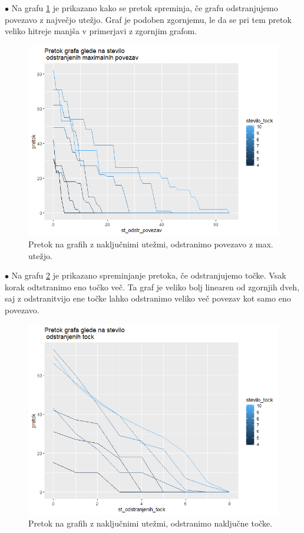 \documentclass[a4paper]{article}
\begin{document}
\pagebreak
$\bullet $ Na grafu \ref{fig4} je prikazano kako se pretok spreminja, če grafu odstranjujemo povezavo z največjo utežjo. Graf je podoben zgornjemu, le da se pri tem pretok veliko hitreje manjša v primerjavi z zgornjim grafom. 
\begin{figure}[H]
\centerline{\includegraphics[scale=.5]{p4.PNG}}
\caption{Pretok na grafih z naključnimi utežmi, odstranimo povezavo z max. utežjo. }
\label{fig4}
\end{figure}

$\bullet $ Na grafu \ref{fig5} je prikazano spreminjanje pretoka, če odstranjujemo točke. Vsak korak odtstranimo eno točko več. Ta graf je veliko bolj linearen od zgornjih dveh, saj z odstranitvijo ene točke lahko odstranimo veliko več povezav kot samo eno povezavo. 
\begin{figure}[H]
\centerline{\includegraphics[scale=.5]{p5.PNG}}
\caption{Pretok na grafih z naključnimi utežmi, odstranimo naključne točke.}
\label{fig5}
\end{figure}
\end{document}
